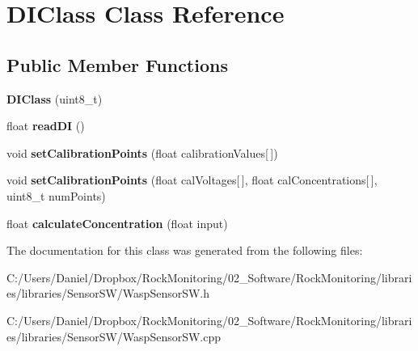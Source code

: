 \hypertarget{class_d_i_class}{}\section{D\+I\+Class Class Reference}
\label{class_d_i_class}
\subsection*{Public Member Functions}
\begin{DoxyCompactItemize}
\item 
{\bfseries D\+I\+Class} (uint8\+\_\+t)\hypertarget{class_d_i_class_ac9341f80aaebb33ad37c3a7c3c00ea60}{}\label{class_d_i_class_ac9341f80aaebb33ad37c3a7c3c00ea60}

\item 
float {\bfseries read\+DI} ()\hypertarget{class_d_i_class_a53d904afd185541d547a6cb7c55e20d4}{}\label{class_d_i_class_a53d904afd185541d547a6cb7c55e20d4}

\item 
void {\bfseries set\+Calibration\+Points} (float calibration\+Values\mbox{[}$\,$\mbox{]})\hypertarget{class_d_i_class_a0d107c2e3d2d18a90c137169c8722038}{}\label{class_d_i_class_a0d107c2e3d2d18a90c137169c8722038}

\item 
void {\bfseries set\+Calibration\+Points} (float cal\+Voltages\mbox{[}$\,$\mbox{]}, float cal\+Concentrations\mbox{[}$\,$\mbox{]}, uint8\+\_\+t num\+Points)\hypertarget{class_d_i_class_ab8fe704712f95347bf45c4ee64bb84b4}{}\label{class_d_i_class_ab8fe704712f95347bf45c4ee64bb84b4}

\item 
float {\bfseries calculate\+Concentration} (float input)\hypertarget{class_d_i_class_a5212d1b14c1fb60c17ed41dc65b688fa}{}\label{class_d_i_class_a5212d1b14c1fb60c17ed41dc65b688fa}

\end{DoxyCompactItemize}


The documentation for this class was generated from the following files\+:\begin{DoxyCompactItemize}
\item 
C\+:/\+Users/\+Daniel/\+Dropbox/\+Rock\+Monitoring/02\+\_\+\+Software/\+Rock\+Monitoring/libraries/libraries/\+Sensor\+S\+W/Wasp\+Sensor\+S\+W.\+h\item 
C\+:/\+Users/\+Daniel/\+Dropbox/\+Rock\+Monitoring/02\+\_\+\+Software/\+Rock\+Monitoring/libraries/libraries/\+Sensor\+S\+W/Wasp\+Sensor\+S\+W.\+cpp\end{DoxyCompactItemize}
